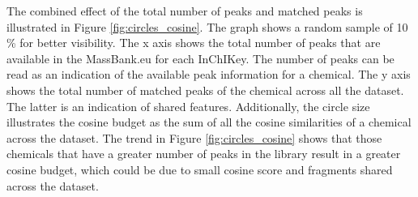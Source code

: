 The combined effect of the total number of peaks and matched peaks is illustrated in Figure \ref{fig:circles_cosine}. The graph shows a random sample of 10 \% for better visibility. The x axis shows the total number of peaks that are available in the MassBank.eu for each InChIKey. The number of peaks can be read as an indication of the available peak information for a chemical. The y axis shows the total number of matched peaks of the chemical across all the dataset. The latter is an indication of shared features. Additionally, the circle size illustrates the cosine budget as the sum of all the cosine similarities of a chemical across the dataset. The trend in Figure \ref{fig:circles_cosine} shows that those chemicals that have a greater number of peaks in the library result in a greater cosine budget, which could be due to small cosine score and fragments shared across the dataset. 




